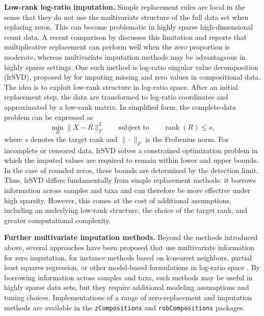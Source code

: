 \noindent\textbf{Low-rank log-ratio imputation.}
Simple replacement rules are local in the sense that they do not use the multivariate structure of the full data set when replacing zeros. This can become problematic in highly sparse high-dimensional count data. A recent comparison by \citet{tang2026critical} discusses this limitation and reports that multiplicative replacement can perform well when the zero proportion is moderate, whereas multivariate imputation methods may be advantageous in highly sparse settings. One such method is log-ratio singular value decomposition (lrSVD), proposed by \citet{palarea-albaladejo2022lrsvd} for imputing missing and zero values in compositional data. The idea is to exploit low-rank structure in log-ratio space. After an initial replacement step, the data are transformed to log-ratio coordinates and approximated by a low-rank matrix. In simplified form, the complete-data problem can be expressed as
\begin{equation}
\min_R \|X-R\|_F^2
\qquad
\text{subject to}
\qquad
\operatorname{rank}(R)\leq s,
\label{eq:2micro:lrsvd_complete}
\end{equation}
where $s$ denotes the target rank and $\|\cdot\|_F$ is the Frobenius norm. For incomplete or censored data, lrSVD solves a constrained optimization problem in which the imputed values are required to remain within lower and upper bounds. In the case of rounded zeros, these bounds are determined by the detection limit. Thus, lrSVD differs fundamentally from simple replacement methods: it borrows information across samples and taxa and can therefore be more effective under high sparsity. However, this comes at the cost of additional assumptions, including an underlying low-rank structure, the choice of the target rank, and greater computational complexity.

\noindent\textbf{Further multivariate imputation methods.}
Beyond the methods introduced above, several approaches have been proposed that use multivariate information for zero imputation, for instance methods based on k-nearest neighbors, partial least squares regression, or other model-based formulations in log-ratio space \citep{hron2010imputation,templ2016imputation,lubbe2021comparison}. By borrowing information across samples and taxa, such methods may be useful in highly sparse data sets, but they require additional modeling assumptions and tuning choices. Implementations of a range of zero-replacement and imputation methods are available in the \texttt{zCompositions} \citep{palarea-albaladejo2015zcompositions} and \texttt{robCompositions} \citep{templ2011robcompositions} packages.

